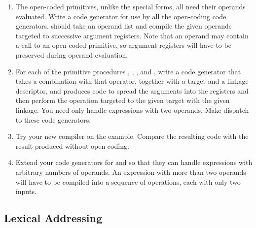 \begin{exercise}
\begin{enumerate}[label = \alph*., leftmargin = *]
		\item
			The open-coded primitives, unlike the special forms, all need their operands evaluated.
			Write a code generator  for use by all the open-coding code generators.
			 should take an operand list and compile the given operands targeted to successive argument registers.
			Note that an operand may contain a call to an open-coded primitive, so argument registers will have to be preserved during operand evaluation.

		\item
			For each of the primitive procedures \code{=}, \code{*}, \code{-}, and \code{+}, write a code generator that takes a combination with that operator, together with a target and a linkage descriptor, and produces code to spread the arguments into the registers and then perform the operation targeted to the given target with the given linkage.
			You need only handle expressions with two operands.
			Make  dispatch to these code generators.

		\item
			Try your new compiler on the  example.
			Compare the resulting code with the result produced without open coding.

		\item
			Extend your code generators for \code{+} and \code{*} so that they can handle expressions with arbitrary numbers of operands.
			An expression with more than two operands will have to be compiled into a sequence of operations, each with only two inputs.

	\end{enumerate}
\end{exercise}



\subsection{Lexical Addressing}
\label{Section 5.5.6}

